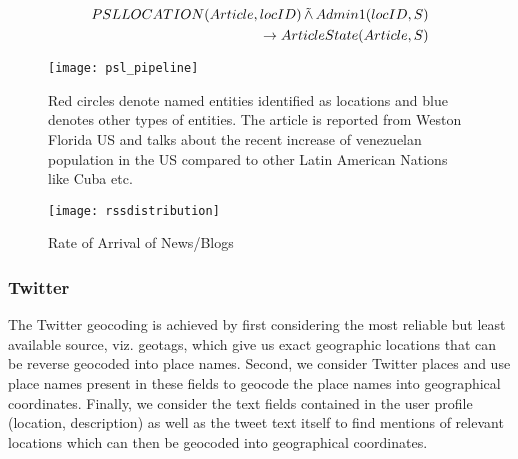 \begin{align*}
    \begin{split}
        PSLLOCATION(Article, locID) \softand Admin1(locID, S)\\
    \rightarrow ArticleState(Article, S)
\end{split}
\end{align*}


\begin{figure*}
    \texttt{[image: psl\_pipeline]}
    \caption{Red circles denote named entities identified as locations and blue denotes other types of entities. The article is reported from Weston Florida US and talks about the recent increase of venezuelan population in the US compared to other Latin American Nations like Cuba etc.}
    \label{fig:psl_example}
\end{figure*}
%

\iffalse Most news articles and blog posts mention multiple locations, e.g.,
the location of reporting, the location of the incident, and locations corresponding
to the hometown of the newspaper. We developed a probabilistic reasoning
engine using probabilistic soft logic (PSL)
to infer the most likely city, state and country which is the main geographic focus the article.The PSL geocoder combines various types of evidence, such as named entities
such as locations, persons, and organizations identified by RLP, as
well as common names and aliases and populations of known
locations. These diverse types of evidence are used in weighted rules
that prioritize their influence on the PSL model's location
prediction. For example, extracted location tokens are strong
indicators of the content location of an article, while organization
and person names containing location names are weaker but still
informative signals; the rules corresponding to these evidence types
are weighted accordingly.

The methodology is similar to {\em Web-a-where: Geo-Tagging Web Content}.
\fi 

\begin{figure}
    \texttt{[image: rssdistribution]}
    \caption{Rate of Arrival of News/Blogs}
    \label{fig:rssdistribution}
\end{figure}

\subsubsection{Twitter}
The Twitter\cite{twitter} geocoding is achieved by first
considering the most reliable but least available source,
viz. geotags, which give us exact geographic locations that can be
reverse geocoded into place names.  Second, we consider Twitter places
and use place names present in these fields to geocode the place names
into geographical coordinates.  Finally, we consider the text fields
contained in the user profile (location, description) as well as the
tweet text itself to find mentions of relevant locations which can
then be geocoded into geographical coordinates.

